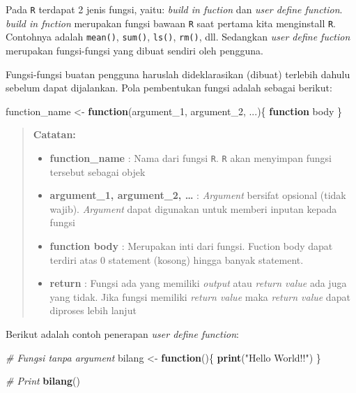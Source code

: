 \documentclass[]{book}
\newenvironment{Shaded}{\begin{snugshade}}{\end{snugshade}}
\newcommand{\CommentTok}[1]{\textcolor[rgb]{0.56,0.35,0.01}{\textit{#1}}}
\newcommand{\ControlFlowTok}[1]{\textcolor[rgb]{0.13,0.29,0.53}{\textbf{#1}}}
\newcommand{\DecValTok}[1]{\textcolor[rgb]{0.00,0.00,0.81}{#1}}
\newcommand{\KeywordTok}[1]{\textcolor[rgb]{0.13,0.29,0.53}{\textbf{#1}}}
\newcommand{\NormalTok}[1]{#1}
\newcommand{\StringTok}[1]{\textcolor[rgb]{0.31,0.60,0.02}{#1}}
\providecommand{\tightlist}{%
  \setlength{\itemsep}{0pt}\setlength{\parskip}{0pt}}
\theoremstyle{definition}
\theoremstyle{definition}
\theoremstyle{definition}
\theoremstyle{remark}
\begin{document}
Pada \texttt{R} terdapat 2 jenis fungsi, yaitu: \emph{build in fuction} dan \emph{user define function}. \emph{build in fnction} merupakan fungsi bawaan \texttt{R} saat pertama kita menginstall \texttt{R}. Contohnya adalah \texttt{mean()}, \texttt{sum()}, \texttt{ls()}, \texttt{rm()}, dll. Sedangkan \emph{user define fuction} merupakan fungsi-fungsi yang dibuat sendiri oleh pengguna.

Fungsi-fungsi buatan pengguna haruslah dideklarasikan (dibuat) terlebih dahulu sebelum dapat dijalankan. Pola pembentukan fungsi adalah sebagai berikut:

\begin{Shaded}
\begin{Highlighting}[]
\NormalTok{function_name <-}\StringTok{ }\ControlFlowTok{function}\NormalTok{(argument_}\DecValTok{1}\NormalTok{, argument_}\DecValTok{2}\NormalTok{, ...)\{}
  \ControlFlowTok{function}\NormalTok{ body}
\NormalTok{\}}
\end{Highlighting}
\end{Shaded}

\begin{quote}
\textbf{Catatan:}

\begin{itemize}
\tightlist
\item
  \textbf{function\_name} : Nama dari fungsi \texttt{R}. \texttt{R} akan menyimpan fungsi tersebut sebagai objek
\item
  \textbf{argument\_1, argument\_2, \ldots{}} : \emph{Argument} bersifat opsional (tidak wajib). \emph{Argument} dapat digunakan untuk memberi inputan kepada fungsi
\item
  \textbf{function body} : Merupakan inti dari fungsi. Fuction body dapat terdiri atas 0 statement (kosong) hingga banyak statement.
\item
  \textbf{return} : Fungsi ada yang memiliki \emph{output} atau \emph{return value} ada juga yang tidak. Jika fungsi memiliki \emph{return value} maka \emph{return value} dapat diproses lebih lanjut
\end{itemize}
\end{quote}

Berikut adalah contoh penerapan \emph{user define function}:

\begin{Shaded}
\begin{Highlighting}[]
\CommentTok{# Fungsi tanpa argument}
\NormalTok{bilang <-}\StringTok{ }\ControlFlowTok{function}\NormalTok{()\{}
  \KeywordTok{print}\NormalTok{(}\StringTok{"Hello World!!"}\NormalTok{)}
\NormalTok{\}}

\CommentTok{# Print}
\KeywordTok{bilang}\NormalTok{()}
\end{Highlighting}
\end{Shaded}
\end{document}
